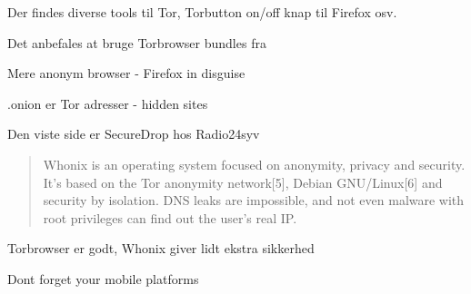 \documentclass[20pt,landscape,a4paper,footrule]{foils}
\begin{document}


Der findes diverse tools til Tor, Torbutton on/off knap til Firefox osv.

Det anbefales at bruge Torbrowser bundles fra 



\centerline{\color{titlecolor} Mere anonym browser - Firefox in disguise}




\centerline{\color{titlecolor} .onion er Tor adresser - hidden sites}

{\footnotesize Den viste side er SecureDrop hos Radio24syv }





\begin{quote}
Whonix is an operating system focused on anonymity, privacy and security. It's based on the Tor anonymity network[5], Debian GNU/Linux[6] and security by isolation. DNS leaks are impossible, and not even malware with root privileges can find out the user's real IP. 

\end{quote}

\centerline{Torbrowser er godt, Whonix giver lidt ekstra sikkerhed}




\centerline{Dont forget your mobile platforms }







\end{document}
